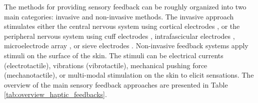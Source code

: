The methods for providing sensory feedback can be roughly organized into two main categories: invasive and non-invasive methods. 
The invasive approach stimulates either the central nervous system using cortical electrodes \cite{tabot2013restoring, tabot2015restoring,collins2016ownership}, or the peripheral nervous system using cuff electrodes \cite{ortiz2014osseointegrated, tan2014neural}, intrafascicular electrodes \cite{raspopovic2014restoring} , microelectrode array \cite{davis2016restoring}, or sieve electrodes \cite{lago2005long}. 
Non-invasive feedback systems apply stimuli on the surface of the skin. The stimuli can be electrical currents (electrotactile), vibrations (vibrotactile), mechanical pushing force (mechanotactile), or multi-modal stimulation on the skin to elicit sensations. The overview of the main sensory feedback approaches are presented in Table \ref{tab:overview_haptic_feedbacks}.

